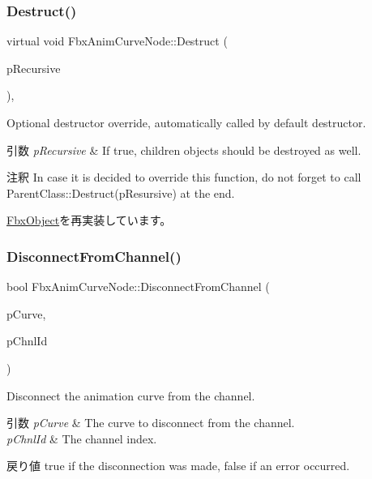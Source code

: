 \subsubsection{\texorpdfstring{Destruct()}{Destruct()}}
{\footnotesize\ttfamily virtual void Fbx\+Anim\+Curve\+Node\+::\+Destruct (\begin{DoxyParamCaption}\item[{bool}]{p\+Recursive }\end{DoxyParamCaption})\hspace{0.3cm}{\ttfamily [protected]}, {\ttfamily [virtual]}}

Optional destructor override, automatically called by default destructor. 
\begin{DoxyParams}{引数}
{\em p\+Recursive} & If true, children objects should be destroyed as well. \\
\hline
\end{DoxyParams}
\begin{DoxyRemark}{注釈}
In case it is decided to override this function, do not forget to call Parent\+Class\+::\+Destruct(p\+Resursive) at the end. 
\end{DoxyRemark}


\hyperlink{class_fbx_object_a123e084d9b32b29c28af6384b7c3c608}{Fbx\+Object}を再実装しています。

\mbox{\label{class_fbx_anim_curve_node_a76db258a1f1d7c2a4a178c00788c7a92}} 
\subsubsection{\texorpdfstring{Disconnect\+From\+Channel()}{DisconnectFromChannel()}}
{\footnotesize\ttfamily bool Fbx\+Anim\+Curve\+Node\+::\+Disconnect\+From\+Channel (\begin{DoxyParamCaption}\item[{\hyperlink{class_fbx_anim_curve}{Fbx\+Anim\+Curve} $\ast$}]{p\+Curve,  }\item[{unsigned int}]{p\+Chnl\+Id }\end{DoxyParamCaption})}

Disconnect the animation curve from the channel. 
\begin{DoxyParams}{引数}
{\em p\+Curve} & The curve to disconnect from the channel. \\
\hline
{\em p\+Chnl\+Id} & The channel index. \\
\hline
\end{DoxyParams}
\begin{DoxyReturn}{戻り値}
{\ttfamily true} if the disconnection was made, {\ttfamily false} if an error occurred. 
\end{DoxyReturn}
\mbox{\label{class_fbx_anim_curve_node_a114170d034199d8a40ccc037c495aa04}} 
